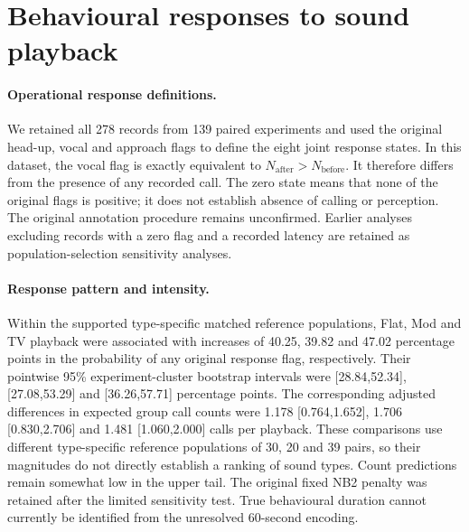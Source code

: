 \section{Behavioural responses to sound playback}
\paragraph{Operational response definitions.}
We retained all 278 records from 139 paired experiments and used the original
head-up, vocal and approach flags to define the eight joint response states.
In this dataset, the vocal flag is exactly equivalent to
$N_{\mathrm{after}}>N_{\mathrm{before}}$.
It therefore differs from the presence of any recorded call. The zero state
means that none of the original flags is positive; it does not establish
absence of calling or perception. The original annotation procedure remains
unconfirmed. Earlier analyses excluding records with a zero flag and a recorded
latency are retained as population-selection sensitivity analyses.

\paragraph{Response pattern and intensity.}
Within the supported type-specific matched reference populations, Flat, Mod and
TV playback were associated with increases of 40.25, 39.82 and 47.02 percentage
points in the probability of any original response flag, respectively.
Their pointwise 95\% experiment-cluster bootstrap intervals were
[28.84,52.34], [27.08,53.29] and [36.26,57.71] percentage points.
The corresponding adjusted differences in expected group call counts were
1.178 [0.764,1.652], 1.706 [0.830,2.706] and 1.481 [1.060,2.000] calls per
playback. These comparisons use different type-specific reference populations
of 30, 20 and 39 pairs, so their magnitudes do not directly establish a ranking
of sound types. Count predictions remain somewhat low in the upper tail.
The original fixed NB2 penalty was retained after the limited sensitivity test.
True behavioural duration cannot currently be identified from the unresolved
60-second encoding.

